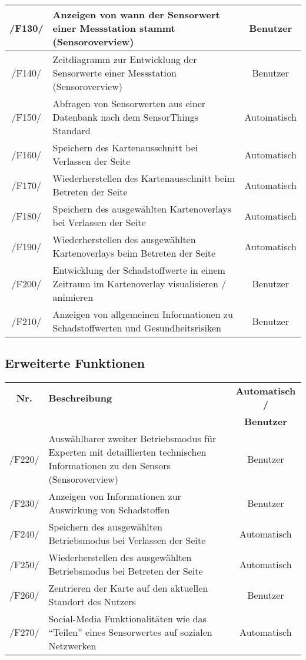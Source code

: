 \begin{tabularx}{\textwidth}{| c | X | c |}
        \hline
        /F130/ & Anzeigen von wann der Sensorwert einer Messstation stammt (\gls{Sensoroverview}) & Benutzer \\
        \hline
        /F140/ & Zeitdiagramm zur Entwicklung der Sensorwerte einer Messstation (\gls{Sensoroverview}) & Benutzer \\
        \hline
        /F150/ & Abfragen von Sensorwerten aus einer Datenbank nach dem SensorThings Standard & Automatisch \\
        \hline
        /F160/ & Speichern des Kartenausschnitt bei Verlassen der Seite & Automatisch \\
        \hline
        /F170/ & Wiederherstellen des Kartenausschnitt beim Betreten der Seite & Automatisch \\
        \hline
        /F180/ & Speichern des ausgewählten \glspl{Kartenoverlay} bei Verlassen der Seite & Automatisch \\
        \hline
        /F190/ & Wiederherstellen des ausgewählten \glspl{Kartenoverlay} beim Betreten der Seite & Automatisch \\
        \hline
        /F200/ & Entwicklung der Schadstoffwerte in einem Zeitraum im \gls{Kartenoverlay} visualisieren / animieren & Benutzer \\
        \hline
        /F210/ & Anzeigen von allgemeinen Informationen zu Schadstoffwerten und Gesundheitsrisiken & Benutzer \\
        \hline
\end{tabularx}
\subsection{Erweiterte Funktionen}
\begin{tabularx}{\textwidth}{| c | X | c |}
\hline
        \textbf{Nr.} & 
        \textbf{Beschreibung} & 
        \textbf{Automatisch /} \\
        & & \textbf{Benutzer} \\
        \hline
        /F220/ & Auswählbarer zweiter Betriebsmodus für Experten mit detaillierten technischen Informationen zu den \glspl{Sensor} (\gls{Sensoroverview}) & Benutzer \\
        \hline
        /F230/ & Anzeigen von Informationen zur Auswirkung von Schadstoffen & Benutzer \\
        \hline
        /F240/ & Speichern des ausgewählten Betriebsmodus bei Verlassen der Seite & Automatisch \\
        \hline
        /F250/ & Wiederherstellen des ausgewählten Betriebsmodus bei Betreten der Seite & Automatisch \\
        \hline
        /F260/ & Zentrieren der Karte auf den aktuellen Standort des Nutzers & Benutzer \\
        \hline
        /F270/ & Social-Media Funktionalitäten wie das \enquote{Teilen} eines Sensorwertes auf sozialen Netzwerken & Automatisch \\
        \hline
\end{tabularx}